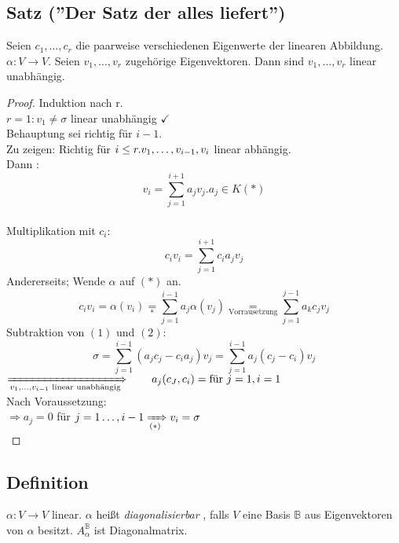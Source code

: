 \subsection{Satz (''Der Satz der alles liefert'')}\label{sec:\thesubsection}
Seien $c_1,\ldots,c_r$ die paarweise verschiedenen Eigenwerte der linearen Abbildung. $\alpha : V  \to V$. Seien $v_1,\ldots,v_r$ zugehörige Eigenvektoren. Dann sind $v_1,\ldots,v_r$ linear unabhängig.
\begin{proof}
Induktion nach r.\\
$r = 1: v_1 \ne \sigma$ linear unabhängig $\checkmark$\\
Behauptung sei richtig für $i-1$.\\
Zu zeigen: Richtig für $i \leq r.\\
v_1,\ldots,v_{i-1},v_i$ linear abhängig.\\
Dann : \[v_i = \sum\limits^{i+1}_{j=1} a_jv_j. a_j \in K (\ast)\]\\
Multiplikation mit $c_i:$
\setcounter{equation}{0}
\begin{equation}
c_iv_i=\sum\limits^{i+1}_{j=1}c_ia_jv_j
\end{equation}
Andererseits; Wende $\alpha$ auf $(\ast)$ an.\\
\begin{equation}
c_iv_i = \alpha(v_i) \underset{\ast}{=} \sum\limits^{i-1}_{j=1}a_j\alpha(v_j) \underset{\text{Vorrausetzung}}{=} \sum\limits^{j-1}_{j=1} a_kc_jv_j
\end{equation}
Subtraktion von $(1)$ und $(2)$:\\
\[ \sigma = \sum\limits^{i-1}_{j=1} (a_jc_j-c_ia_j)v_j = \sum\limits^{i-1}_{j=1}a_j (c_j-c_i) v_j \]
$\xRightarrow[v_1,\ldots,v_{i-1} \text{ linear unabhängig} ]{} \qquad a_j (c_J,c_i) = \\ \text{für }j=1, i=1 $\\
Nach Voraussetzung:\\
$\Rightarrow a_j = 0$ für $j=1\ldots,i-1\\
\xRightarrow[(\ast)]{}v_i = \sigma$\Lightning\\
\end{proof}
\subsection{Definition}\label{sec:\thesubsection}
$\alpha : V \to V$ linear. $\alpha$ hei\ss t \emph{diagonalisierbar} , falls $V$ eine Basis $\mathbb{B}$ aus Eigenvektoren von $\alpha$ besitzt. $A^{\mathbb{B}}_\alpha$ ist Diagonalmatrix.
